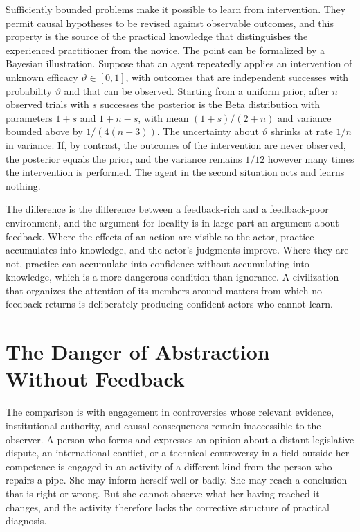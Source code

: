 \documentclass[11pt]{report}
\theoremstyle{definition}
\theoremstyle{remark}
\begin{document}
Sufficiently bounded problems make it possible to learn from intervention. They permit causal hypotheses to be revised against observable outcomes, and this property is the source of the practical knowledge that distinguishes the experienced practitioner from the novice. The point can be formalized by a Bayesian illustration. Suppose that an agent repeatedly applies an intervention of unknown efficacy $\vartheta\in[0,1]$, with outcomes that are independent successes with probability $\vartheta$ and that can be observed. Starting from a uniform prior, after $n$ observed trials with $s$ successes the posterior is the Beta distribution with parameters $1+s$ and $1+n-s$, with mean $(1+s)/(2+n)$ and variance bounded above by $1/(4(n+3))$. The uncertainty about $\vartheta$ shrinks at rate $1/n$ in variance. If, by contrast, the outcomes of the intervention are never observed, the posterior equals the prior, and the variance remains $1/12$ however many times the intervention is performed. The agent in the second situation acts and learns nothing.

The difference is the difference between a feedback-rich and a feedback-poor environment, and the argument for locality is in large part an argument about feedback. Where the effects of an action are visible to the actor, practice accumulates into knowledge, and the actor's judgments improve. Where they are not, practice can accumulate into confidence without accumulating into knowledge, which is a more dangerous condition than ignorance. A civilization that organizes the attention of its members around matters from which no feedback returns is deliberately producing confident actors who cannot learn.

\section{The Danger of Abstraction Without Feedback}

The comparison is with engagement in controversies whose relevant evidence, institutional authority, and causal consequences remain inaccessible to the observer. A person who forms and expresses an opinion about a distant legislative dispute, an international conflict, or a technical controversy in a field outside her competence is engaged in an activity of a different kind from the person who repairs a pipe. She may inform herself well or badly. She may reach a conclusion that is right or wrong. But she cannot observe what her having reached it changes, and the activity therefore lacks the corrective structure of practical diagnosis.
\end{document}
